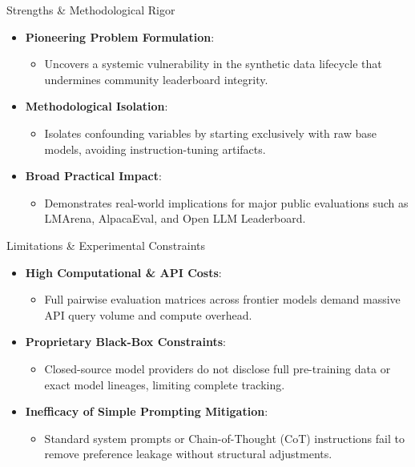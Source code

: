 \documentclass[10pt]{beamer}
\begin{document}
	\begin{frame}{Strengths \& Methodological Rigor}
		\begin{itemize}
			\item \textbf{Pioneering Problem Formulation}:
			\begin{itemize}
				\item Uncovers a systemic vulnerability in the synthetic data lifecycle that undermines community leaderboard integrity.
			\end{itemize}
			\vspace{0.3cm}
			\item \textbf{Methodological Isolation}:
			\begin{itemize}
				\item Isolates confounding variables by starting exclusively with raw base models, avoiding instruction-tuning artifacts.
			\end{itemize}
			\vspace{0.3cm}
			\item \textbf{Broad Practical Impact}:
			\begin{itemize}
				\item Demonstrates real-world implications for major public evaluations such as LMArena, AlpacaEval, and Open LLM Leaderboard.
			\end{itemize}
		\end{itemize}
	\end{frame}
	
	
	\begin{frame}{Limitations \& Experimental Constraints}
		\begin{itemize}
			\item \textbf{High Computational \& API Costs}:
			\begin{itemize}
				\item Full pairwise evaluation matrices across frontier models demand massive API query volume and compute overhead.
			\end{itemize}
			\vspace{0.3cm}
			\item \textbf{Proprietary Black-Box Constraints}:
			\begin{itemize}
				\item Closed-source model providers do not disclose full pre-training data or exact model lineages, limiting complete tracking.
			\end{itemize}
			\vspace{0.3cm}
			\item \textbf{Inefficacy of Simple Prompting Mitigation}:
			\begin{itemize}
				\item Standard system prompts or Chain-of-Thought (CoT) instructions fail to remove preference leakage without structural adjustments.
			\end{itemize}
		\end{itemize}
	\end{frame}
	
\end{document}

